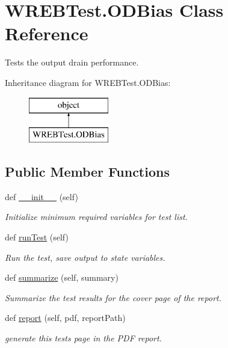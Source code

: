 \hypertarget{class_w_r_e_b_test_1_1_o_d_bias}{}\section{W\+R\+E\+B\+Test.\+O\+D\+Bias Class Reference}
\label{class_w_r_e_b_test_1_1_o_d_bias}


Tests the output drain performance.  


Inheritance diagram for W\+R\+E\+B\+Test.\+O\+D\+Bias\+:\begin{figure}[H]
\begin{center}
\leavevmode
\includegraphics[height=2.000000cm]{class_w_r_e_b_test_1_1_o_d_bias}
\end{center}
\end{figure}
\subsection*{Public Member Functions}
\begin{DoxyCompactItemize}
\item 
def \hyperlink{class_w_r_e_b_test_1_1_o_d_bias_a5ab5511ac55947fbb770513f93ad86c3}{\+\_\+\+\_\+init\+\_\+\+\_\+} (self)
\begin{DoxyCompactList}\small\item\em Initialize minimum required variables for test list. \end{DoxyCompactList}\item 
def \hyperlink{class_w_r_e_b_test_1_1_o_d_bias_a70f5249d1a85164c7f3e59cad8ee23a1}{run\+Test} (self)
\begin{DoxyCompactList}\small\item\em Run the test, save output to state variables. \end{DoxyCompactList}\item 
def \hyperlink{class_w_r_e_b_test_1_1_o_d_bias_af6e5f6d44037247cc05e587cb8c8a642}{summarize} (self, summary)
\begin{DoxyCompactList}\small\item\em Summarize the test results for the cover page of the report. \end{DoxyCompactList}\item 
def \hyperlink{class_w_r_e_b_test_1_1_o_d_bias_a75f47041ae9a27789365773619cb2aad}{report} (self, pdf, report\+Path)
\begin{DoxyCompactList}\small\item\em generate this test\textquotesingle{}s page in the P\+DF report. \end{DoxyCompactList}\end{DoxyCompactItemize}


